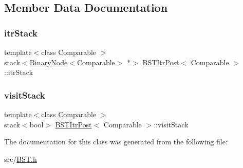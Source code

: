 \subsection{Member Data Documentation}
\mbox{\label{classBSTItrPost_add32204909b8a6c3635b926832192ced}} 
\subsubsection{\texorpdfstring{itr\+Stack}{itrStack}}
{\footnotesize\ttfamily template$<$class Comparable $>$ \\
stack$<$\hyperlink{classBinaryNode}{Binary\+Node}$<$Comparable$>$ $\ast$$>$ \hyperlink{classBSTItrPost}{B\+S\+T\+Itr\+Post}$<$ Comparable $>$\+::itr\+Stack\hspace{0.3cm}{\ttfamily [private]}}

\mbox{\label{classBSTItrPost_a5a9af907c7b135acdf3b5ed9affbb9a7}} 
\subsubsection{\texorpdfstring{visit\+Stack}{visitStack}}
{\footnotesize\ttfamily template$<$class Comparable $>$ \\
stack$<$bool$>$ \hyperlink{classBSTItrPost}{B\+S\+T\+Itr\+Post}$<$ Comparable $>$\+::visit\+Stack\hspace{0.3cm}{\ttfamily [private]}}



The documentation for this class was generated from the following file\+:\begin{DoxyCompactItemize}
\item 
src/\hyperlink{BST_8h}{B\+S\+T.\+h}\end{DoxyCompactItemize}
